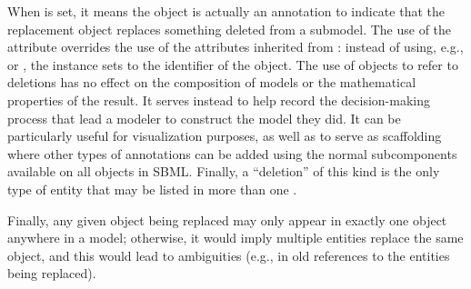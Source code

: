When  is set, it means the \ReplacedElement object is
actually an annotation to indicate that the replacement object replaces
something deleted from a submodel.  The use of the 
attribute overrides the use of the attributes inherited from \SBaseRef:
instead of using, e.g.,  or , the
\ReplacedElement instance sets  to the identifier of the
\Deletion object.  The use of \ReplacedElement objects to refer to
deletions has no effect on the composition of models or the mathematical
properties of the result.  It serves instead to help record the
decision-making process that lead a modeler to construct the model they
did.  It can be particularly useful for visualization purposes, as well
as to serve as scaffolding where other types of annotations can be added
using the normal \Annotation subcomponents available on all \SBase
objects in SBML.  Finally, a ``deletion'' \ReplacedElement of this kind
is the only type of entity that may be listed in more than one
\ListOfReplacedElements.

Finally, any given object being replaced may only appear in exactly one
\ReplacedElement object anywhere in a model; otherwise, it would imply
multiple entities replace the same object, and this would lead to
ambiguities (e.g., in old references to the entities being replaced).

%


